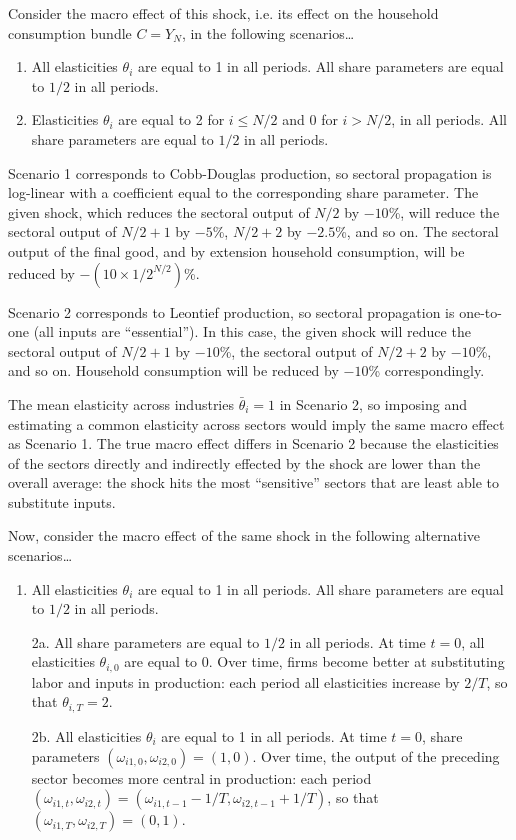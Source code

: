 \documentclass[11pt]{article}
\begin{document}
Consider the macro effect of this shock, i.e. its effect on the household consumption bundle $C = Y_N$, in the following scenarios\dots

\begin{enumerate}
    \item All elasticities $\theta_i$ are equal to 1 in all periods. All share parameters are equal to $1/2$ in all periods.
    \item Elasticities $\theta_i$ are equal to 2 for $i \leq N/2$ and 0 for $i > N/2$, in all periods. All share parameters are equal to $1/2$ in all periods.
\end{enumerate}

Scenario 1 corresponds to Cobb-Douglas production, so sectoral propagation is log-linear with a coefficient equal to the corresponding share parameter. The given shock, which reduces the sectoral output of $N/2$ by $-10$\%, will reduce the sectoral output of $N/2+1$ by $-5$\%, $N/2+2$ by $-2.5$\%, and so on. The sectoral output of the final good, and by extension household consumption, will be reduced by $-(10 \times 1/2^{N/2})$\%. 

Scenario 2 corresponds to Leontief production, so sectoral propagation is one-to-one (all inputs are ``essential''). In this case, the given shock will reduce the sectoral output of $N/2+1$ by $-10$\%, the sectoral output of $N/2+2$ by $-10$\%, and so on. Household consumption will be reduced by $-10$\% correspondingly. 

The mean elasticity across industries $\bar{\theta}_i = 1$ in Scenario 2, so imposing and estimating a common elasticity across sectors would imply the same macro effect as Scenario 1. The true macro effect differs in Scenario 2 because the elasticities of the sectors directly and indirectly effected by the shock are lower than the overall average: the shock hits the most ``sensitive'' sectors that are least able to substitute inputs.

Now, consider the macro effect of the same shock in the following alternative scenarios\dots 

\begin{enumerate}
    \item All elasticities $\theta_i$ are equal to 1 in all periods. All share parameters are equal to $1/2$ in all periods.
    \item[2a.] All share parameters are equal to $1/2$ in all periods. At time $t=0$, all elasticities $\theta_{i,0}$ are equal to 0. Over time, firms become better at substituting labor and inputs in production: each period all elasticities increase by $2/T$, so that $\theta_{i,T} = 2$.
    \item[2b.] All elasticities $\theta_i$ are equal to 1 in all periods. At time $t=0$, share parameters $(\omega_{i1,0}, \omega_{i2,0}) = (1,0)$. Over time, the output of the preceding sector becomes more central in production: each period $(\omega_{i1,t}, \omega_{i2,t}) = (\omega_{i1,t-1}-1/T,\omega_{i2,t-1} + 1/T)$, so that $(\omega_{i1,T}, \omega_{i2,T}) = (0,1)$.
\end{enumerate}
\end{document}
